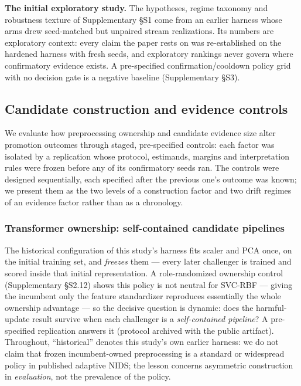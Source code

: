 \documentclass[a4paper,fleqn]{cas-sc}
\begin{document}
\textbf{The initial exploratory study.} The hypotheses, regime taxonomy and robustness texture of Supplementary \S S1 come from an earlier harness whose arms drew seed-matched but unpaired stream realizations. Its numbers are exploratory context: every claim the paper rests on was re-established on the hardened harness with fresh seeds, and exploratory rankings never govern where confirmatory evidence exists. A pre-specified confirmation/cooldown policy grid with no decision gate is a negative baseline (Supplementary \S S3).


\subsection{Candidate construction and evidence controls}
\label{sec:construction}

We evaluate how preprocessing ownership and candidate evidence size alter promotion outcomes through staged, pre-specified controls: each factor was isolated by a replication whose protocol, estimands, margins and interpretation rules were frozen before any of its confirmatory seeds ran. The controls were designed sequentially, each specified after the previous one's outcome was known; we present them as the two levels of a construction factor and two drift regimes of an evidence factor rather than as a chronology.

\subsubsection{Transformer ownership: self-contained candidate pipelines}
\label{sec:symmetric_method}

The historical configuration of this study's harness fits scaler and PCA once, on the initial training set, and \emph{freezes} them --- every later challenger is trained and scored inside that initial representation. A role-randomized ownership control (Supplementary \S S2.12) shows this policy is not neutral for SVC-RBF --- giving the incumbent only the feature standardizer reproduces essentially the whole ownership advantage --- so the decisive question is dynamic: does the harmful-update result survive when each challenger is a \emph{self-contained pipeline}? A pre-specified replication answers it (protocol archived with the public artifact). Throughout, ``historical'' denotes this study's own earlier harness: we do not claim that frozen incumbent-owned preprocessing is a standard or widespread policy in published adaptive NIDS; the lesson concerns asymmetric construction in \emph{evaluation}, not the prevalence of the policy.
\end{document}
